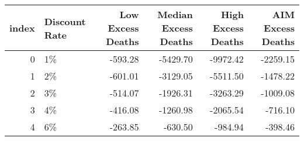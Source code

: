 \begin{tabular}{rlrrrr}
\toprule
index & Discount Rate & Low Excess Deaths & Median Excess Deaths & High Excess Deaths & AIM Excess Deaths \\
\midrule
0 & 1\% & -593.28 & -5429.70 & -9972.42 & -2259.15 \\
1 & 2\% & -601.01 & -3129.05 & -5511.50 & -1478.22 \\
2 & 3\% & -514.07 & -1926.31 & -3263.29 & -1009.08 \\
3 & 4\% & -416.08 & -1260.98 & -2065.54 & -716.10 \\
4 & 6\% & -263.85 & -630.50 & -984.94 & -398.46 \\
\bottomrule
\end{tabular}
